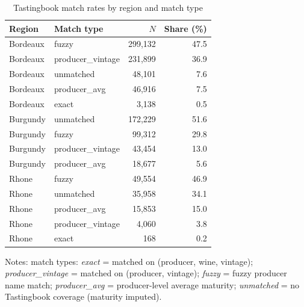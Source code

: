 \begin{table}[htbp]
\centering
\caption{Tastingbook match rates by region and match type}
\label{tab:tb_match_rates}
\small
\begin{threeparttable}
\begin{tabular}{llrr}
\toprule
Region & Match type & $N$ & Share (\%) \\
\midrule
Bordeaux & fuzzy & 299,132 & 47.5 \\
Bordeaux & producer\_vintage & 231,899 & 36.9 \\
Bordeaux & unmatched & 48,101 & 7.6 \\
Bordeaux & producer\_avg & 46,916 & 7.5 \\
Bordeaux & exact & 3,138 & 0.5 \\
Burgundy & unmatched & 172,229 & 51.6 \\
Burgundy & fuzzy & 99,312 & 29.8 \\
Burgundy & producer\_vintage & 43,454 & 13.0 \\
Burgundy & producer\_avg & 18,677 & 5.6 \\
Rhone & fuzzy & 49,554 & 46.9 \\
Rhone & unmatched & 35,958 & 34.1 \\
Rhone & producer\_avg & 15,853 & 15.0 \\
Rhone & producer\_vintage & 4,060 & 3.8 \\
Rhone & exact & 168 & 0.2 \\
\bottomrule
\end{tabular}
\begin{tablenotes}
\footnotesize
\item Notes: match types: \textit{exact} = matched on (producer, wine, vintage);
  \textit{producer\_vintage} = matched on (producer, vintage);
  \textit{fuzzy} = fuzzy producer name match;
  \textit{producer\_avg} = producer-level average maturity;
  \textit{unmatched} = no Tastingbook coverage (maturity imputed).
\end{tablenotes}
\end{threeparttable}
\end{table}
